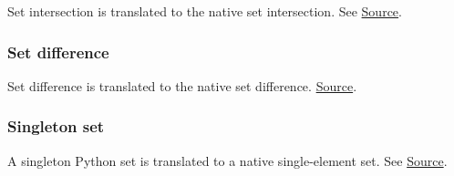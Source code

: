 Set intersection is translated to the \tlap{} native set intersection.  See
\href{https://github.com/saltiniroberto/ssf/blob/7ea6e18093d9da3154b4e396dd435549f687e6b9/high_level/common/pythonic_code_generic.py#L42-L43}{Source}.

\subsubsection{Set difference}


\begin{mathpar}
\end{mathpar}

Set difference is translated to the \tlap{} native set difference.
\href{https://github.com/saltiniroberto/ssf/blob/7ea6e18093d9da3154b4e396dd435549f687e6b9/high_level/common/pythonic_code_generic.py#L46-L47}{Source}.

\subsubsection{Singleton set}


\begin{mathpar}
\end{mathpar}

A singleton Python set is translated to a \tlap{} native single-element set.
See
\href{https://github.com/saltiniroberto/ssf/blob/7ea6e18093d9da3154b4e396dd435549f687e6b9/high_level/common/pythonic_code_generic.py#L50-L51}{Source}.

